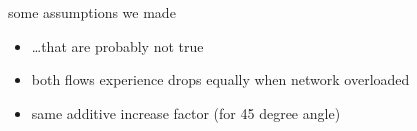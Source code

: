 \begin{frame}{some assumptions we made}
    \begin{itemize}
    \item \ldots that are probably not true
    \vspace{.5cm}
    \item both flows experience drops equally when network overloaded
    \item same additive increase factor (for 45 degree angle)
    \end{itemize}
\end{frame}
